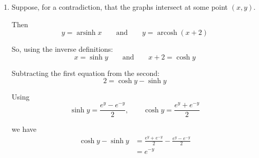\documentclass[leqno]{article}
\begin{document}
\begin{enumerate}[
  label=\textbf{\arabic*.},
  leftmargin=*,
  topsep=0pt,
  partopsep=0pt,
  parsep=0pt
]
\begin{djsSolution}
\begin{enumerate}[label=\textbf{(\alph*)}]
Now let
\[
t=e^y
\]

Since \(e^y>0\), we have \(t>0\), and also \(e^{-y}=\frac1t\). So
\[
2x=t+\frac1t
\]

Multiplying by \(t\):
\[
2xt=t^2+1
\]

so
\[
t^2-2xt+1=0
\]

This is a quadratic in \(t\), so
\begin{align*}
t&=\frac{2x\pm\sqrt{(2x)^2-4}}{2}\\
&=\frac{2x\pm\sqrt{4x^2-4}}{2}\\
&=x\pm\sqrt{x^2-1}
\end{align*}

Hence
\[
e^y=x\pm\sqrt{x^2-1}
\]

We now choose the correct sign. Since \(y\geq 0\), we have
\[
e^y\geq 1
\]

Also
\begin{align*}
x-\sqrt{x^2-1}
&=\frac{(x-\sqrt{x^2-1})(x+\sqrt{x^2-1})}{x+\sqrt{x^2-1}}\\
&=\frac{x^2-(x^2-1)}{x+\sqrt{x^2-1}}\\
&=\frac{1}{x+\sqrt{x^2-1}}
\end{align*}

For \(x\geq 1\), the denominator is at least \(1\), so
\[
x-\sqrt{x^2-1}\leq 1
\]

Therefore the appropriate root is
\[
e^y=x+\sqrt{x^2-1}
\]

Taking natural logarithms:
\[
y=\ln\left(x+\sqrt{x^2-1}\right)
\]

Since \(y=\operatorname{arcosh}x\), we have proved that
\[
\operatorname{arcosh}x=\ln\left(x+\sqrt{x^2-1}\right)\qquad (x\geq 1)
\]

  \item Suppose, for a contradiction, that the graphs intersect at some point \((x,y)\).

Then
\[
y=\operatorname{arsinh}x
\qquad\text{and}\qquad
y=\operatorname{arcosh}(x+2)
\]

So, using the inverse definitions:
\[
x=\sinh y
\qquad\text{and}\qquad
x+2=\cosh y
\]

Subtracting the first equation from the second:
\[
2=\cosh y-\sinh y
\]

Using
\[
\sinh y=\frac{e^y-e^{-y}}{2},\qquad \cosh y=\frac{e^y+e^{-y}}{2}
\]

we have
\begin{align*}
\cosh y-\sinh y
&=\frac{e^y+e^{-y}}{2}-\frac{e^y-e^{-y}}{2}\\
&=e^{-y}
\end{align*}


\end{enumerate}
\end{djsSolution}
\end{enumerate}
\end{document}
